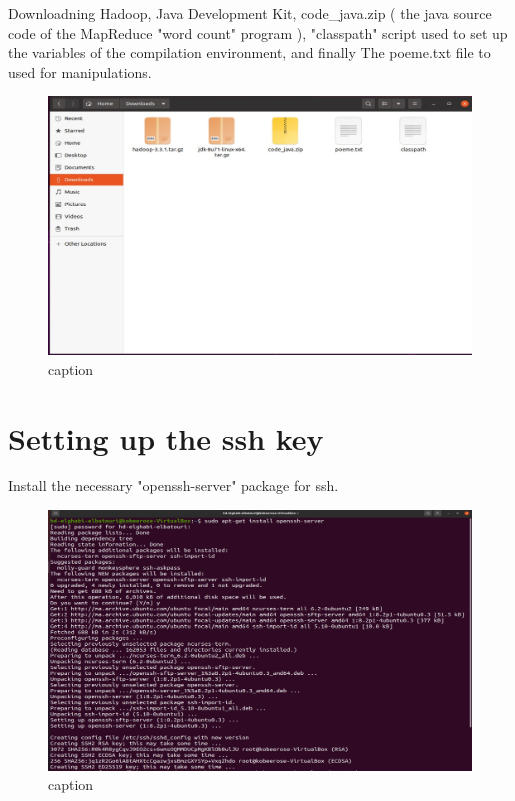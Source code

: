 \begin{spacing}{1.2}
\par Downloadning Hadoop, Java Development Kit, code_java.zip ( the java source code of the MapReduce "word count" program ), "classpath" script used to set up the variables of the compilation environment, and finally The poeme.txt file to used for manipulations.
\\
\begin{figure}[!htb] 
\begin{center} 
\includegraphics[width=1\linewidth]{Big_Data/Hadoop/Apache Hadoop Installation/Downloading required files.jpg} 
\end{center} 
\caption{caption} 
\end{figure} 
\FloatBarrier

\section{Setting up the ssh key }

\par Install the necessary "openssh-server" package for ssh.
\\
\begin{figure}[!htb] 
\begin{center} 
\includegraphics[width=1\linewidth]{Big_Data/Hadoop/Apache Hadoop Installation/Installing openssh-server.jpg} 
\end{center} 
\caption{caption} 
\end{figure} 
\FloatBarrier




\end{spacing}
